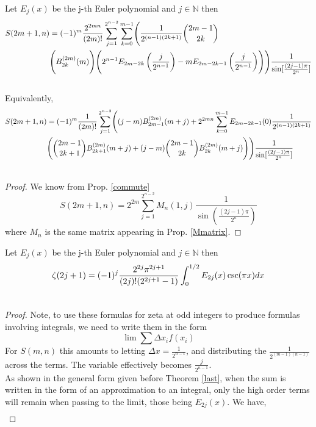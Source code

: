 \documentclass[fleqn,a4paper,9pt]{article}
\begin{document}
\begin{flushleft}
\begin{theorem}\label{last}
Let $E_j(x)$ be the j-th Euler polynomial and $j\in\mathbb{N}$ then
\begin{align}
S(2m+1,n)&=(-1)^m\frac{2^{2mn}}{(2m)!}\sum_{j=1}^{2^{n-2}}\sum_{k=0}^{m-1}\Biggl(\frac{1}{2^{(n-1)(2k+1)}}\binom{2m-1}{2k}\\\notag
&\Biggl(B_{2k}^{(2m)}(m)\Biggr)\Biggl(2^{n-1}E_{2m-2k}\left(\frac{j}{2^{n-1}}\right)-mE_{2m-2k-1}\left(\frac{j}{2^{n-1}}\right)\Biggr)\Biggr)\frac{1}{\sin[\frac{(2j-1)\pi}{2^n}]}\\\notag
\end{align}
Equivalently,
\begin{align}
S(2m+1,n)&=(-1)^m\frac{1}{(2m)!}\sum_{j=1}^{2^{n-2}}\Biggl((j-m)B_{2m-1}^{(2m)}(m+j)+2^{2mn}\sum_{k=0}^{m-1}E_{2m-2k-1}(0)\frac{1}{2^{(n-1)(2k+1)}}\\\notag
&\Biggl(\binom{2m-1}{2k+1}B_{2k+1}^{(2m)}(m+j)+(j-m)\binom{2m-1}{2k}B_{2k}^{(2m)}(m+j)\Biggr)\Biggr)\frac{1}{\sin[\frac{(2j-1)\pi}{2^n}]}\\\notag
\end{align}
\end{theorem}
\begin{proof}
We know from Prop. \ref{commute}
 $$S(2m+1,n)=2^{2m} \sum_{j=1}^{2^{n-2}}M_n(1,j)\frac{1}{\sin(\frac{(2j-1)\pi}{2^n})}$$
where $M_n$ is the same matrix appearing in Prop. \ref{Mmatrix}.
\end{proof}
\begin{corollary}
Let $E_j(x)$ be the j-th Euler polynomial and $j\in\mathbb{N}$ then
\begin{align}
\zeta(2j+1)&=(-1)^j\frac{2^{2j}\pi^{2j+1}}{(2j)!(2^{2j+1}-1)}\int_{0}^{1/2}E_{2j}(x)\csc (\pi  x)dx\\\notag
\end{align}
\end{corollary}
\begin{proof}
Note, to use these formulas for zeta at odd integers to produce formulas involving integrals, we need to write them in the form $$\lim\sum \Delta x_i f(x_i)$$ For $S(m,n)$ this amounts to letting $\Delta x=\frac{1}{2^{n-1}}$, and distributing the $\frac{1}{2^{(m-1)(n-1)}}$ across the terms. The variable effectively becomes $\frac{j}{2^{n-1}}$.\\ As shown in the general form given before Theorem \ref{last}, when the sum is written in the form of an approximation to an integral, only the high order terms will remain when passing to the limit, those being $E_{2j}(x)$.
We have,
\begin{align}

\end{align}
\end{proof}
\end{flushleft}
\end{document}
